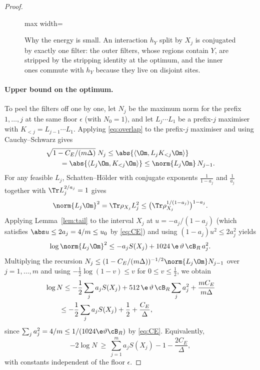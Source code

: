 \begin{proof}
\begin{figure}[t]
\centering
\begin{adjustbox}{max width=\linewidth}

\end{adjustbox}
\caption{Why the energy is small. An interaction $h_Y$ split by $X_j$ is conjugated by exactly one filter: the outer filters, whose regions contain $Y$, are stripped by the stripping identity at the optimum, and the inner ones commute with $h_Y$ because they live on disjoint sites.}\label{fig:qc-single-split}
\end{figure}

\paragraph{Upper bound on the optimum.}
To peel the filters off one by one, let $N_j$ be the maximum norm for the
prefix $1,\dots,j$ at the same floor $\epsilon$ (with $N_0=1$), and let
$L_j\cdots L_1$ be a prefix-$j$ maximiser with $K_{<j}=L_{j-1}\cdots L_1$.
Applying \eqref{eq:overlap} to the prefix-$j$ maximiser and using
Cauchy--Schwarz gives
\[
\begin{split}
 &\sqrt{1-C_E/(m\Delta)}\;N_j\le\abs{\langle\Om,L_jK_{<j}\Om\rangle}\\
 &\qquad=\abs{\langle L_j\Om,K_{<j}\Om\rangle}\le\norm{L_j\Om}\,N_{j-1}.
\end{split}
\]
For any feasible $L_j$, Schatten--Hölder with conjugate exponents
$\frac1{1-a_j}$ and $\frac1{a_j}$ together with $\Tr L_j^{2/a_j}=1$ gives
\[
 \norm{L_j\Om}^2=\Tr\rho_{X_j}L_j^2\le\bigl(\Tr\rho_{X_j}^{1/(1-a_j)}\bigr)^{1-a_j}.
\]
Applying Lemma~\ref{lem:tail} to the interval $X_j$ at
$u=-a_j/(1-a_j)$ (which satisfies $\abs u\le 2a_j=4/m\le u_0$ by
\eqref{eq:CE}) and using $(1-a_j)u^2\le 2a_j^2$ yields
\[
 \log\norm{L_j\Om}^2\le -a_jS(X_j)+1024\,\e\,\vartheta\,\cB_R\,a_j^2 .
\]
Multiplying the recursion $N_j\le(1-C_E/(m\Delta))^{-1/2}\norm{L_j\Om}N_{j-1}$
over $j=1,\dots,m$ and using $-\frac12\log(1-v)\le v$ for $0\le v\le\frac12$,
we obtain
\[
\begin{split}
 &\log N\le-\frac12\sum_ja_jS(X_j)+512\,\e\,\vartheta\,\cB_R\sum_ja_j^2+\frac{mC_E}{m\Delta}\\
 &\qquad\le -\frac12\sum_ja_jS(X_j)+\frac12+\frac{C_E}{\Delta},
\end{split}
\]
since $\sum_ja_j^2=4/m\le 1/(1024\e\vartheta\cB_R)$ by \eqref{eq:CE}. Equivalently,
\begin{equation}\label{eq:lowerN}
 -2\log N\ \ge\ \sum_{j=1}^ma_jS(X_j)-1-\frac{2C_E}{\Delta},
\end{equation}
with constants independent of the floor $\epsilon$.


\end{proof}
